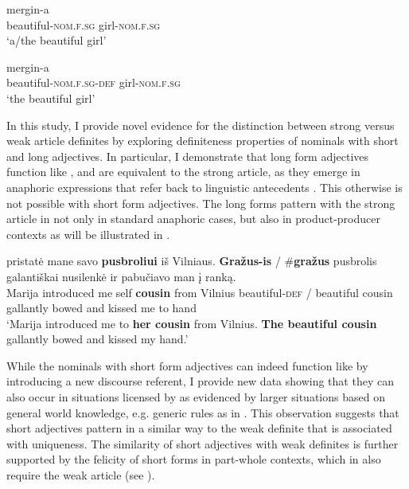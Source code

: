 \documentclass[output=paper,
modfonts
]{langscibook}
\begin{document}
\begin{exe}
\ex \label{ex:sereikaite:1} 
\begin{xlist}
\ex 
{} {mergin-a} \\
beautiful-\textsc{nom.f.sg}  girl-\textsc{nom.f.sg}\\
\trans `a/the beautiful girl'  \label{ex:sereikaite:1a} 

\ex 
{} {mergin-a}\\
beautiful-\textsc{nom.f.sg}-{\textsc{def}} girl-\textsc{nom.f.sg}\\
\trans `the beautiful girl' \label{ex:sereikaite:1b}
\end{xlist}
\end{exe}

In this study, I provide novel evidence for the distinction between strong versus weak article definites \citep{Schwarz2009} by exploring definiteness properties of  nominals with short and long adjectives. In particular, I demonstrate that long form adjectives function like , and are equivalent to the  strong article, as they emerge in anaphoric expressions that refer back to linguistic antecedents . This  otherwise is not possible with short form adjectives. The long forms pattern with the strong article in  not only in standard anaphoric cases, but also in product-producer  contexts as will be illustrated in .\largerpage[2]

\begin{exe}
\ex\label{ex:sereikaite:2} 
 {pristatė} {mane} {savo} \textbf{pusbroliui} {iš} {Vilniaus}. \textbf{Gražus-is} \textnormal{/} \textnormal{\#}\textbf{gražus} {pusbrolis} {galantiškai} {nusilenkė} {ir} {pabučiavo} {man} {į} {ranką}.\\
Marija introduced me self \textbf{cousin} from Vilnius {beautiful-\textsc{def}} / {\phantom{\#}beautiful} cousin gallantly bowed and kissed me to hand \\
\trans `Marija introduced me to \textbf{her cousin} from Vilnius. \textbf{The beautiful cousin} gallantly bowed and kissed my hand.'
\end{exe}


While the nominals with short form adjectives can indeed function like  by introducing a new discourse referent, I provide new data showing that they can also occur in situations licensed by  as evidenced by larger situations based on general world knowledge, e.g. generic rules as in . This observation suggests that short adjectives pattern in a similar way to the weak definite that is associated with uniqueness. 
The similarity of short adjectives with weak definites is further supported by the felicity of short forms in part-whole  contexts, which in  also require the weak article (see ). 
\end{document}
